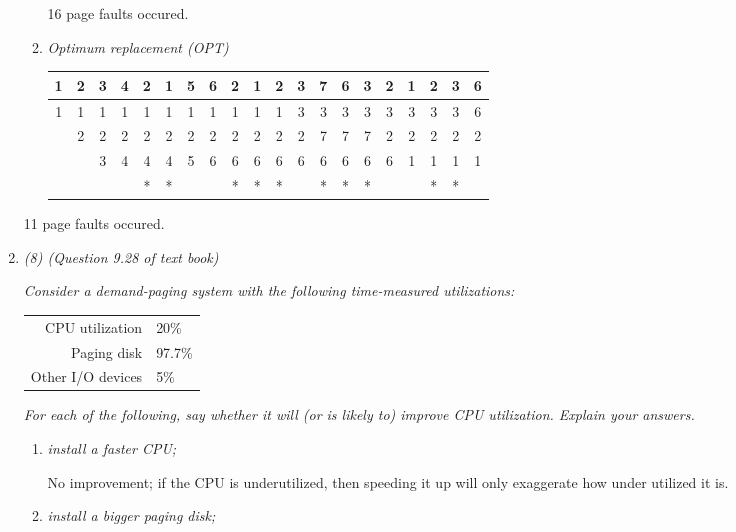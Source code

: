\documentclass[letterpaper,11pt]{article}
\begin{document}
\begin{enumerate}
\begin{enumerate}
16 page faults occured.
    \item \emph{Optimum replacement (OPT)}

\begin{center}
  \begin{tabular}{ | c | c | c | c | c | c | c | c | c | c | c | c | c | c | c | c | c | c | c | c | }
  \hline
                     1 & 2 & 3 & 4 & 2 & 1 & 5 & 6 & 2 & 1 & 2 & 3 & 7 & 6 & 3 & 2 & 1 & 2 & 3 & 6 \\ \hline 
                     1 & 1 & 1 & 1 & 1 & 1 & 1 & 1 & 1 & 1 & 1 & 3 & 3 & 3 & 3 & 3 & 3 & 3 & 3 & 6 \\
                       & 2 & 2 & 2 & 2 & 2 & 2 & 2 & 2 & 2 & 2 & 2 & 7 & 7 & 7 & 2 & 2 & 2 & 2 & 2 \\ 
                       &   & 3 & 4 & 4 & 4 & 5 & 6 & 6 & 6 & 6 & 6 & 6 & 6 & 6 & 6 & 1 & 1 & 1 & 1 \\ \hline
                       &   &   &   & * & * &   &   & * & * & * &   & * & * & * &   &   & * & * &   \\ \hline
  \end{tabular}
\end{center}
  \end{enumerate}
 
11 page faults occured.
 
\item \textit{(8) (Question 9.28 of text book)}

\textit{Consider a demand-paging system with the following time-measured utilizations:}

\begin{center} 
  \begin{tabular}{ r  l }
    CPU utilization & 20\% \\ 
    Paging disk & 97.7\% \\
    Other I/O devices & 5\% \\ 
  \end{tabular}
\end{center}

\emph{For each of the following, say whether it will (or is likely to) improve CPU utilization. Explain your answers.}

  \begin{enumerate}
    \item \emph{install a faster CPU;}

    No improvement; if the CPU is underutilized, then speeding it up will only exaggerate how under utilized it is.
    \item \emph{install a bigger paging disk;}


\end{enumerate}
\end{enumerate}
\end{document}
